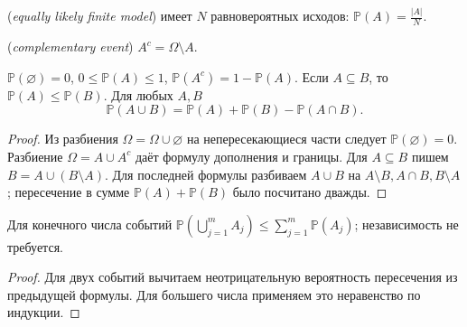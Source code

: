 \ifdim\dimexpr\ht\CatFlowBox+\dp\CatFlowBox\relax<64mm\dp\CatFlowBox=\dimexpr64mm-\ht\CatFlowBox\relax\fi%
\noindent\usebox{\CatFlowBox}\par\addvspace{5pt}
\begin{definition} (\emph{equally likely finite model}) имеет \(N\) равновероятных исходов: \(\mathbb P(A)=\frac{|A|}{N}\). \par{} (\emph{complementary event}) \(A^c=\Omega\setminus A\).\end{definition}
\begin{theorem}
\(\mathbb P(\varnothing)=0\), \(0\le\mathbb P(A)\le1\), \(\mathbb P(A^c)=1-\mathbb P(A)\). Если \(A\subseteq B\), то \(\mathbb P(A)\le\mathbb P(B)\). Для любых \(A,B\)
\[
\mathbb P(A\cup B)=\mathbb P(A)+\mathbb P(B)-\mathbb P(A\cap B).
\]
\end{theorem}
\begin{proof}Из разбиения \(\Omega=\Omega\cup\varnothing\) на непересекающиеся части следует \(\mathbb P(\varnothing)=0\). Разбиение \(\Omega=A\cup A^c\) даёт формулу дополнения и границы. Для \(A\subseteq B\) пишем \(B=A\cup(B\setminus A)\). Для последней формулы разбиваем \(A\cup B\) на \(A\setminus B,A\cap B,B\setminus A\); пересечение в сумме \(\mathbb P(A)+\mathbb P(B)\) было посчитано дважды.\end{proof}
\begin{theorem}
Для конечного числа событий \(\mathbb P(\bigcup_{j=1}^m A_j)\le\sum_{j=1}^m\mathbb P(A_j)\); независимость не требуется.
\end{theorem}
\begin{proof}Для двух событий вычитаем неотрицательную вероятность пересечения из предыдущей формулы. Для большего числа применяем это неравенство по индукции.\end{proof}
